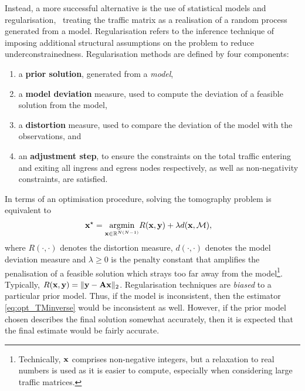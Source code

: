 Instead, a more successful alternative is the use of statistical
models and regularisation, \ie\ treating the traffic matrix as a
realisation of a random process generated from a model. Regularisation
refers to the inference technique of imposing additional structural
assumptions on the problem to reduce
underconstrainedness. Regularisation methods are defined by four
components:
\begin{enumerate}
\item a \textbf{prior solution}, generated from a \emph{model}, 
\item a \textbf{model deviation} measure, used to compute the deviation of a feasible solution from the model, 
\item a \textbf{distortion} measure, used to compare the deviation of the model with the observations, and
\item an \textbf{adjustment step}, to ensure the constraints on the total traffic entering and exiting all ingress and egress nodes 
respectively, as well as non-negativity constraints, are satisfied.
\end{enumerate}
In terms of an optimisation procedure, solving the tomography problem is equivalent to
\begin{eqnarray}
\label{eq:opt_TMinverse}
\bx^\star = \argmin_{\bx \in \Real^{N(N-1)}} & R(\bx,\by) + \lambda d(\bx,\cM),
\end{eqnarray}
where $R(\cdot,\cdot)$ denotes the distortion measure,
$d(\cdot,\cdot)$ denotes the model deviation measure and $\lambda \ge
0$ is the penalty constant that amplifies the penalisation of a
feasible solution which strays too far away from the model\footnote
{Technically, $\mathbf{x}$ comprises non-negative integers, but a relaxation
  to real numbers is used as it is easier to compute, especially when
  considering large traffic matrices.}. Typically, $R(\mathbf{x},\mathbf{y}) = \|\mathbf{y}
- \mathbf{A} \mathbf{x}\|_2$. Regularisation techniques are \emph{biased} to a
particular prior model. Thus, if the model is inconsistent, then the
estimator \eqref{eq:opt_TMinverse} would be inconsistent as
well. However, if the prior model chosen describes the final solution
somewhat accurately, then it is expected that the final estimate would
be fairly accurate.

